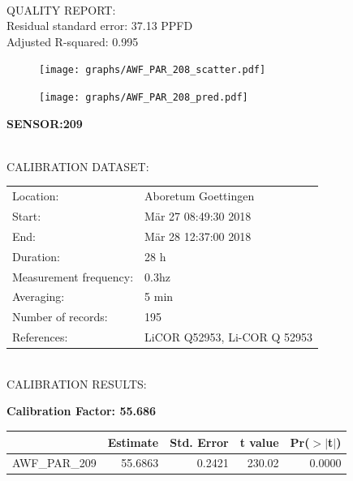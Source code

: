 \documentclass[oneside]{report}
\begin{document}
\hrulefill\\
QUALITY REPORT:\\
Residual standard error: 37.13 PPFD\\
Adjusted R-squared: 0.995



\begin{figure}[H]
  \centering
  \texttt{[image: graphs/AWF\_PAR\_208\_scatter.pdf]}
\end{figure}




\begin{figure}[H]
  \centering
  \texttt{[image: graphs/AWF\_PAR\_208\_pred.pdf]}
\end{figure}

\pagebreak


\begin{center}
\large{\textbf{SENSOR:209}}\\
\end{center}

\hrulefill\\
CALIBRATION DATASET:\\
\begin{table}[h!]
  \centering
  \label{tab:table1}
  \begin{tabular}{ll}
    Location: & Aboretum Goettingen\\ 
    
    
    Start:  & Mär 27 08:49:30 2018 \\
    End:   & Mär 28 12:37:00 2018\\ 
    Duration: & 28 h\\
    Measurement frequency: & 0.3hz\\
    Averaging:  &5 min\\
    Number of records: & 195 \\
    References: & LiCOR Q52953, Li-COR Q 52953 \\
  \end{tabular}
\end{table}

\hrulefill\\
CALIBRATION RESULTS:\\


\begin{center}
\textbf{\large{Calibration Factor: 55.686}}\\
\end{center}
\begin{table}[ht]
\centering
\begin{tabular}{rrrrr}
  \hline
 & Estimate & Std. Error & t value & Pr($>$$|$t$|$) \\ 
  \hline
AWF\_PAR\_209 & 55.6863 & 0.2421 & 230.02 & 0.0000 \\ 
   \hline
\end{tabular}
\end{table}
\end{document}
